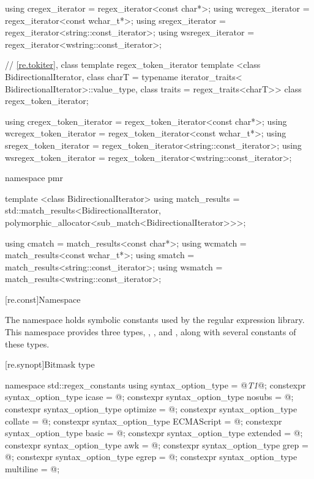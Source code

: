 \begin{codeblock}
{  using cregex_iterator  = regex_iterator<const char*>;
  using wcregex_iterator = regex_iterator<const wchar_t*>;
  using sregex_iterator  = regex_iterator<string::const_iterator>;
  using wsregex_iterator = regex_iterator<wstring::const_iterator>;

  // \ref{re.tokiter}, class template regex_token_iterator
  template <class BidirectionalIterator,
            class charT = typename iterator_traits<
              BidirectionalIterator>::value_type,
            class traits = regex_traits<charT>>
    class regex_token_iterator;

  using cregex_token_iterator  = regex_token_iterator<const char*>;
  using wcregex_token_iterator = regex_token_iterator<const wchar_t*>;
  using sregex_token_iterator  = regex_token_iterator<string::const_iterator>;
  using wsregex_token_iterator = regex_token_iterator<wstring::const_iterator>;

  namespace pmr {
    template <class BidirectionalIterator>
      using match_results =
        std::match_results<BidirectionalIterator,
                           polymorphic_allocator<sub_match<BidirectionalIterator>>>;

    using cmatch  = match_results<const char*>;
    using wcmatch = match_results<const wchar_t*>;
    using smatch  = match_results<string::const_iterator>;
    using wsmatch = match_results<wstring::const_iterator>;
  }
}
\end{codeblock}

[re.const]{Namespace }

\pnum
{}%
The namespace  holds
symbolic constants used by the regular expression library.  This
namespace provides three types, ,
, and , along with several
constants of these types.

[re.synopt]{Bitmask type }
%
%
\begin{codeblock}
namespace std::regex_constants {
  using syntax_option_type = @\textit{T1}@;
  constexpr syntax_option_type icase = @\unspec@;
  constexpr syntax_option_type nosubs = @\unspec@;
  constexpr syntax_option_type optimize = @\unspec@;
  constexpr syntax_option_type collate = @\unspec@;
  constexpr syntax_option_type ECMAScript = @\unspec@;
  constexpr syntax_option_type basic = @\unspec@;
  constexpr syntax_option_type extended = @\unspec@;
  constexpr syntax_option_type awk = @\unspec@;
  constexpr syntax_option_type grep = @\unspec@;
  constexpr syntax_option_type egrep = @\unspec@;
  constexpr syntax_option_type multiline = @\unspec@;
}
\end{codeblock}


